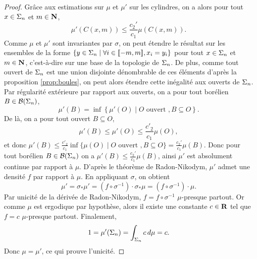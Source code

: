 \begin{proof}
      Grâce aux estimations sur $\mu$ et $\mu'$ sur les cylindres, on a alors pour tout $x \in \Sigma_n$ et $m \in \mathbf N$,
      $$\mu'(C(x, m)) \leq \frac{c_2'}{c_1}\mu(C(x, m)).$$
      Comme $\mu$ et $\mu'$ sont invariantes par $\sigma$, on peut étendre le résultat sur les ensembles de la forme
      $\left\{y\in\Sigma_n \mid \forall i \in [\![ -m, m]\!], x_i = y_i\right\}$ pour tout $x \in \Sigma_n$ et $m \in \mathbf N$,
      c'est-à-dire sur une base de la topologie de $\Sigma_n$.
      De plus, comme tout ouvert de $\Sigma_n$ est une union disjointe dénombrable de ces éléments d'après la proposition \ref{prop:boules},
      on peut alors étendre cette inégalité aux ouverts de $\Sigma_n$.
      Par régularité extérieure par rapport aux ouverts, on a pour tout borélien $B \in \mathcal{B}(\Sigma_n)$,
      $$\mu'(B) = \inf\left\{\mu'(O) \mid O \text{ ouvert }, B \subseteq O\right\}.$$
      De là, on a pour tout ouvert $B \subseteq O$,
      $$\mu'(B) \leq \mu'(O) \leq \frac{c'_2}{c_1} \mu(O),$$
      et donc $\mu'(B) \leq \frac{c'_2}{c_1}\inf\{\mu(O) \mid O \text{ ouvert }, B \subseteq O\} = \frac{c_2'}{c_1}\mu(B)$.
      Donc pour tout borélien $B \in \mathcal{B}(\Sigma_n)$ on a $\mu'(B) \leq \frac{c_2'}{c_1}\mu(B)$, ainsi $\mu'$ est absolument continue par rapport à $\mu$.
      D'après le théorème de Radon-Nikodym, $\mu'$ admet une densité $f$ par rapport à $\mu$.
      En appliquant $\sigma$, on obtient
      $$\mu' = \sigma_*\mu' = (f\circ\sigma^{-1})\cdot\sigma_*\mu = (f\circ\sigma^{-1})\cdot\mu.$$
      Par unicité de la dérivée de Radon-Nikodym, $f = f \circ \sigma^{-1}$ $\mu$-presque partout.
      Or comme $\mu$ est ergodique par hypothèse, alors il existe une constante $c \in \mathbf R$ tel que $f = c$ $\mu$-presque partout.
      Finalement,
      $$1 = \mu'(\Sigma_n) = \int_{\Sigma_n}{c\,d\mu} = c.$$
      Donc $\mu = \mu'$, ce qui prouve l'unicité.
  \end{proof}
